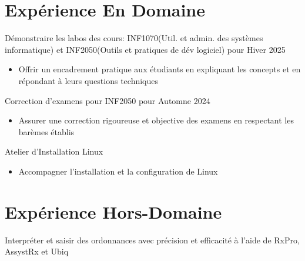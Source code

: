 \documentclass[letterpaper,10pt]{article}
\begin{document}

  \section{Expérience En Domaine}

  \begin{resume_list}
    \item Démonstraire les labos des cours: INF1070(Util. et admin. des systèmes informatique) et INF2050(Outils et pratiques de dév logiciel) pour Hiver 2025
    \begin{itemize}
    \item{Offrir un encadrement pratique aux étudiants en expliquant les concepts et en répondant à leurs questions techniques}
    \end{itemize}
    \vspace{3pt}
    \item Correction d'examens pour INF2050 pour Automne 2024
    \begin{itemize}
    \item{Assurer une correction rigoureuse et objective des examens en respectant les barèmes établis}
    \end{itemize}
    \item Atelier d'Installation Linux
    \begin{itemize}
    \item{Accompagner l'installation et la configuration de Linux}
    \end{itemize}
  \end{resume_list}

   \section{Expérience Hors-Domaine}

  \begin{resume_list}
    \item Interpréter et saisir des ordonnances avec précision et efficacité à l'aide de RxPro, AssystRx et Ubiq
  \end{resume_list}
\end{document}

